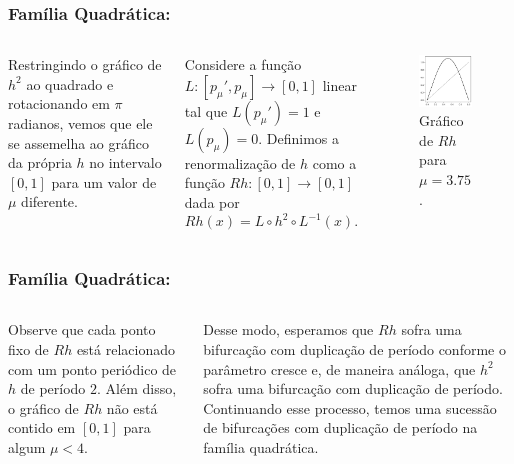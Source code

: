 \begin{frame}
\vspace{5pt}
\frametitle{Família Quadrática: \subsecname}
\begin{columns}
\column{\dimexpr\paperwidth-15pt}

Restringindo o gráfico de $h^2$ ao quadrado e rotacionando em $\pi$ radianos, vemos que ele se assemelha ao gráfico da própria $h$ no intervalo $[0, 1]$ para um valor de $\mu$ diferente.

Considere a função $L: [p_\mu', p_\mu] \to [0, 1]$ linear tal que $L(p_\mu') = 1$ e $L(p_\mu) = 0$. Definimos a renormalização de $h$ como a função $Rh: [0, 1] \to [0, 1]$ dada por
$$Rh(x) = L \circ h^2 \circ L^{-1}(x).$$

\begin{figure}[!htb]
\centering
\includegraphics[scale=0.4]{images/renormalization.png}
\caption{Gráfico de $Rh$ para $\mu = 3.75$.}
\label{renormalization}
\end{figure}

\end{columns}
\end{frame}


\begin{frame}
\vspace{5pt}
\frametitle{Família Quadrática: \subsecname}
\begin{columns}
\column{\dimexpr\paperwidth-15pt}

Observe que cada ponto fixo de $Rh$ está relacionado com um ponto periódico de $h$ de período $2$. Além disso, o gráfico de $Rh$ não está contido em $[0, 1]$ para algum $\mu < 4$.

Desse modo, esperamos que $Rh$ sofra uma bifurcação com duplicação de período conforme o parâmetro cresce e, de maneira análoga, que $h^2$ sofra uma bifurcação com duplicação de período. Continuando esse processo, temos uma sucessão de bifurcações com duplicação de período na família quadrática.

\end{columns}
\end{frame}

